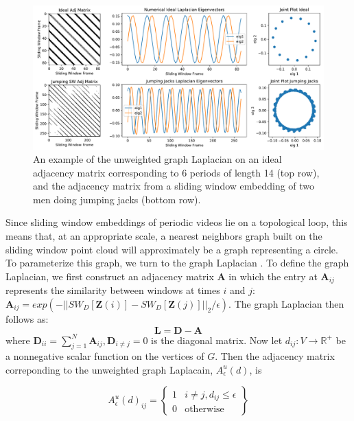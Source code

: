\documentclass{article}
\newcommand{\mb}{\mathbf}
\begin{document}
\begin{figure}[h!]
\centering
\includegraphics[width=\columnwidth]{CirculantExample.pdf}
\caption{An example of the unweighted graph Laplacian on an ideal adjacency matrix corresponding to 6 periods of length 14 (top row), and the adjacency matrix from a sliding window embedding of two men doing jumping jacks (bottom row).  }
\label{fig:CirculantExample}
\end{figure}

Since sliding window embeddings of periodic videos lie on a topological loop, this means that, at an appropriate scale, a nearest neighbors graph built on the sliding window point cloud will approximately be a graph representing a circle.  To parameterize this graph, we turn to the graph Laplacian \cite{chung1997spectral}. To define the graph Laplacian, we first construct an adjacency matrix $\mb{A}$ in which the entry at $\mb{A}_{ij}$ represents the similarity between windows at times $i$ and $j$: $\mb{A}_{ij} = exp(-||SW_{D}[\mb{Z}(i)] - SW_{D}[\mb{Z}(j)]||_2/\epsilon)$. The graph Laplacian then follows as:
\begin{equation}
	\mb{L} = \mb{D}-\mb{A}
\end{equation}
where $\mb{D}_{ii} = \sum_{j = 1}^N \mb{A}_{ij}, \mb{D}_{i \neq j} = 0$ is the diagonal matrix.  Now let $d_{ij}: V \rightarrow \mathbb{R}^+$ be a nonnegative scalar function on the vertices of $G$.  Then the adjacency matrix correponding to the unweighted graph Laplacain, $A_{\epsilon}^u(d)$, is

\begin{equation}
A_{\epsilon}^u(d)_{ij} = \left\{ \begin{array}{cc} 1 & i \neq j, d_{ij} \leq \epsilon \\ 0 & \text{otherwise} \end{array} \right\}
\end{equation}
\end{document}
